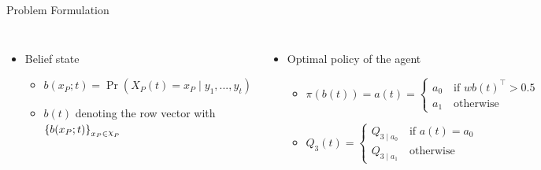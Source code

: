 \documentclass[
english,%
aspectratio=169,%
color={accentcolor=3b},
logo=true,%
colorframetitle=false,%
]{tudabeamer}
\DeclareRobustCommand{\rchi}{{\mathpalette\irchi\relax}}
\newcommand{\irchi}[2]{\raisebox{\depth}{$#1\chi$}}
\begin{document}
\begin{frame}{Problem Formulation}
{
}
\begin{columns}[onlytextwidth,]
\begin{itemize}
\item Belief state
\begin{itemize}
	\item $ b(x_P; t) = \operatorname{Pr}( X_P(t) = x_P \mid y_{1}, ..., y_{t}) $
	\vspace{5pt}
	\item $ b(t) $ denoting the row vector with $ \left\lbrace b(x_P;t)\right\rbrace_{x_P \in \rchi_P} $
\end{itemize}
\end{itemize}
\begin{itemize}
\item Optimal policy of the agent
\begin{itemize}
	\item $ \pi(b(t)) = a(t) = 
	\begin{cases}
	a_0  \quad \text{if } wb(t)^\intercal > 0.5 \\
	a_1  \quad \text{otherwise}
	\end{cases} $
	\vspace{5pt}
	\item $ Q_3(t)  = \begin{cases}
	Q_{3\mid a_{0}}  \quad \text{if } a(t) = a_0 \\
	Q_{3\mid a_{1}}  \quad \text{otherwise}
	\end{cases} $
\end{itemize}
\end{itemize}
\end{columns}
\end{frame}
\end{document}
